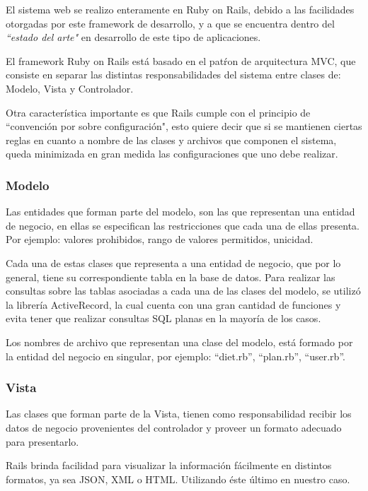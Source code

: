 \documentclass[runningheads,a4paper,spanish]{llncs}
\begin{document}
El sistema web se realizo enteramente en Ruby on Rails, debido a las facilidades otorgadas por este framework de desarrollo, y a que se encuentra dentro del \textit{“estado del arte"} en desarrollo de este tipo de aplicaciones.

El framework Ruby on Rails está basado en el patŕon de arquitectura MVC, que consiste en separar las distintas responsabilidades del sistema entre clases de: Modelo, Vista y Controlador.
 
Otra característica importante es que Rails cumple con el principio de “convención por sobre configuración", esto quiere decir que si se mantienen ciertas reglas en cuanto a nombre de las clases y archivos que componen el sistema, queda minimizada en gran medida las configuraciones que uno debe realizar.

\subsubsection{Modelo}

Las entidades que forman parte del modelo, son las que representan una entidad de negocio, en ellas se especifican las restricciones que cada una de ellas presenta. Por ejemplo: valores prohibidos, rango de valores permitidos, unicidad.

Cada una de estas clases que representa a una entidad de negocio, que por lo general, tiene su correspondiente tabla en la base de datos.  Para realizar las consultas sobre las tablas asociadas a cada una de las clases del modelo, se utilizó la librería ActiveRecord, la cual cuenta con una gran cantidad de funciones y evita tener que realizar consultas SQL planas en la mayoría de los casos.

Los nombres de archivo que representan una clase del modelo, está formado por la entidad del negocio en singular, por ejemplo: "`diet.rb"', "`plan.rb"', "`user.rb"'.

\subsubsection{Vista}

Las clases que forman parte de la Vista, tienen como responsabilidad recibir los datos de negocio provenientes del controlador y proveer un formato adecuado para presentarlo.

Rails brinda facilidad para visualizar la información fácilmente en distintos formatos, ya sea JSON, XML o HTML.  Utilizando éste último en nuestro caso.
\end{document}
